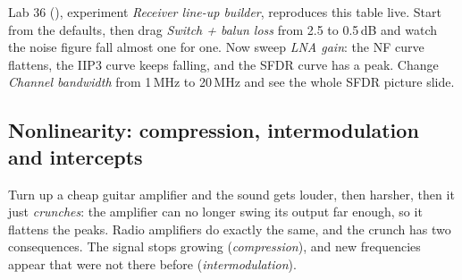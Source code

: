 \begin{tryit}
Lab 36 (), experiment \emph{Receiver line-up builder}, reproduces this
table live. Start from the defaults, then drag \emph{Switch + balun loss} from 2.5 to 0.5\,dB and watch
the noise figure fall almost one for one. Now sweep \emph{LNA gain}: the NF curve flattens, the IIP3
curve keeps falling, and the SFDR curve has a peak. Change \emph{Channel bandwidth} from 1\,MHz to
20\,MHz and see the whole SFDR picture slide.
\end{tryit}


\subsection{Nonlinearity: compression, intermodulation and intercepts}

Turn up a cheap guitar amplifier and the sound gets louder, then harsher, then it just
\emph{crunches}: the amplifier can no longer swing its output far enough, so it flattens the peaks.
Radio amplifiers do exactly the same, and the crunch has two consequences. The signal stops growing
(\emph{compression}), and new frequencies appear that were not there before (\emph{intermodulation}).

